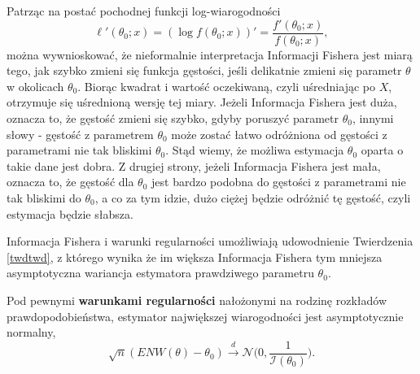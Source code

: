 \newpage
Patrząc na postać pochodnej funkcji log-wiarogodności
$$\ell'(\theta_0;x) = (\log f(\theta_0;x))' = \dfrac{f'(\theta_0;x)}{f(\theta_0;x)},$$
można wywnioskować, że nieformalnie interpretacja Informacji Fishera jest miarą tego, jak szybko zmieni się funkcja gęstości, jeśli delikatnie zmieni się parametr $\theta$ w okolicach $\theta_0$. Biorąc kwadrat i wartość oczekiwaną, czyli uśredniając po $X$, otrzymuje się uśrednioną wersję tej miary. Jeżeli Informacja Fishera jest duża, oznacza to, że gęstość zmieni się szybko, gdyby poruszyć parametr $\theta_0$, innymi słowy - gęstość z parametrem $\theta_0$ może zostać łatwo odróżniona od gęstości z parametrami nie tak bliskimi $\theta_0$.
Stąd wiemy, że możliwa estymacja $\theta_0$ oparta o takie dane jest dobra. Z drugiej strony, jeżeli
Informacja Fishera jest mała, oznacza to, że gęstość dla $\theta_0$ jest bardzo podobna do gęstości z parametrami nie tak bliskimi do $\theta_0$, a co za tym idzie, dużo ciężej będzie odróżnić tę gęstość, czyli estymacja będzie słabsza.

Informacja Fishera i warunki regularności umożliwiają udowodnienie Twierdzenia \ref{twdtwd}, z którego wynika że im większa Informacja Fishera tym mniejsza asymptotyczna wariancja estymatora prawdziwego parametru $\theta_0$.

\begin{theorem}\label{twdtwd}
Pod pewnymi \textbf{warunkami regularności} nałożonymi na rodzinę rozkładów prawdopodobieństwa, estymator największej wiarogodności jest asymptotycznie normalny, 
$$ \sqrt{n}(ENW(\theta) - \theta_0) \overset{d}{\rightarrow} \mathcal{N}\Big(0, \dfrac{1}{\mathcal{I}(\theta_0)}\Big).$$
\end{theorem}

